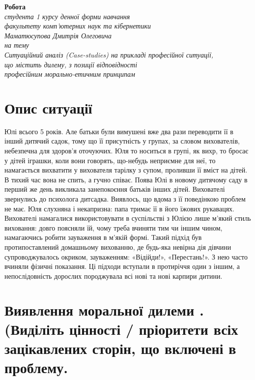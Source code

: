 \documentclass[a4paper,12pt]{article}
\begin{document}

    \begin{center}
        \textbf{Робота \\}
        \textit{
            студента 1 курсу денної форми навчання \\
            факультету комп'ютерних наук та кібернетики \\
            Маматюсупова Дмитрія Олеговича \\
            на тему \\
            Ситуаційний аналіз (Case-studies)  на прикладі  професійної ситуації, \\
            що містить дилему, з позиції відповідності \\
            професійним морально-етичним принципам\\}

    \end{center}

    \section{Опис ситуації}
    Юлі всього 5 років. Але батьки були вимушені вже два рази переводити її в інший дитячий садок,
    тому що її присутність у групах, за словом вихователів, небезпечна для здоров'я оточуючих.
    Юля то носиться в групі, як вихр, то бросає у дітей іграшки, коли вони говорять, що-небудь неприємне для неї,
    то намагається вихватити у вихователя тарілку з супом, проливши її вміст на дітей. В тихий час вона не спить,
    а гучно співає. Поява Юлі в новому дитячому саду в перший же день викликала занепокоєння батьків
    інших дітей. Вихователі звернулись до психолога дитсадка. Виявлось, що вдома з
    її поведінкою проблем не має. Юля слухняна і некапризна: папа тримає
    її в його їжових рукавацях. Вихователі намагалися використовувати в суспільстві з
    Юлією лише м'який стиль виховання: довго поясняли їй, чому треба вчиняти тим чи іншим чином,
    намагаючись робити зауваження в м'якій формі. Такий підхід був протипоставлений домашньому вихованню,
    де будь-яка невірна дія дівчини супроводжувалось окриком, зауваженням: «Відійди!», «Перестань!».
    З нею часто вчиняли фізичні показання. Ці підходи вступали в протиріччя один з іншим,
    а непослідовність дорослих породжувала всі нові та нові карпири дитини.

    \section{Виявлення моральної дилеми . (Виділіть цінності / пріоритети всіх зацікавлених сторін, що включені в проблему.}
\end{document}
